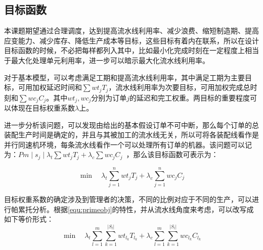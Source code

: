 \subsection{目标函数}
本课题期望通过合理调度，达到提高流水线利用率、减少浪费、缩短制造期、提高应变能力、减少库存、降低生产成本等目标，这些目标有着内在联系，所以在设计目标函数的时候，不必把每样都列入其中，比如最小化完成时刻在一定程度上相当于最大化处理单元利用率，进一步可以暗示最大化流水线利用率。

对于基本模型，可以考虑满足工期和提高流水线利用率，其中满足工期为主要目标，可用加权延迟时间和$\sum wt_jT_j$，流水线利用率为次要目标，可用加权完成总时刻和$\sum wc_jC_j$。其中$wt_j, wc_j$分别为订单$j$的延迟和完工权重。两目标的重要程度可以体现在目标权重系数$\lambda$上。

进一步分析该问题，可以发现由给出的基本假设订单不可中断，那么每个订单的总装配生产时间是确定的，并且与其被加工的流水线无关，所以可将各装配线看作是并行同速机环境，每条流水线看作一个可以处理所有订单的机器。该问题可以记为：$Pm \mid s_j\mid\lambda_t\sum wt_jT_j + \lambda_c\sum wc_jC_j$\ ，那么该目标函数可表示为：

\begin{equation}
\min\quad \lambda_t\sum_{j = 1}^n wt_jT_j +\lambda_c\sum_{j=1}^n wc_jC_j
\label{equ:primeobj}
\end{equation}

目标权重系数的确定涉及到管理者的决策，不同的比例对应于不同的生产，可以进行帕累托分析。根据\eqref{equ:primeobj}的特性，并从流水线角度来考虑，可以改写成如下等价形式：
\begin{equation}
\min\quad \lambda_t\sum_{l=1}^m\sum_{k=1}^{|S_l|} wt_{l_k}T_{l_k} + \lambda_c\sum_{l=1}^m\sum_{k=1}^{|S_l|}wc_{l_k}C_{l_k}
\label{equ:objmain}
\end{equation}
